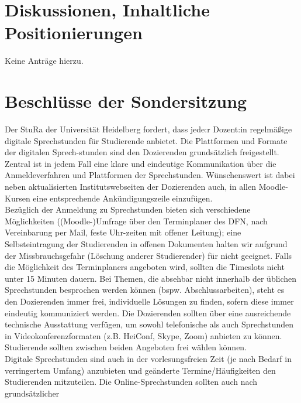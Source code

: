 \section{Diskussionen, Inhaltliche Positionierungen}
Keine Anträge hierzu.
\section{Beschlüsse der Sondersitzung}
    

    {
        Der StuRa der Universität Heidelberg fordert, dass jede:r Dozent:in regelmäßige
        digitale
        Sprechstunden für Studierende anbietet. Die Plattformen und Formate der digitalen
        Sprech-stunden sind den Dozierenden grundsätzlich freigestellt. Zentral ist in jedem
        Fall
        eine klare und eindeutige Kommunikation über die Anmeldeverfahren und Plattformen
        der Sprechstunden. Wünschenswert ist dabei neben aktualisierten Institutswebseiten
        der
        Dozierenden auch, in allen Moodle-Kursen eine entsprechende Ankündigungszeile
        einzufügen.\\
        Bezüglich der Anmeldung zu Sprechstunden bieten sich verschiedene Möglichkeiten
        ((Moodle-)Umfrage über den Terminplaner des DFN, nach Vereinbarung per Mail, feste
        Uhr-zeiten mit offener Leitung); eine Selbsteintragung der Studierenden in offenen
        Dokumenten halten wir aufgrund der Missbrauchsgefahr (Löschung anderer
        Studierender) für nicht geeignet. Falls die Möglichkeit des Terminplaners angeboten
        wird, sollten die Timeslots nicht unter 15 Minuten dauern. Bei Themen, die absehbar
        nicht innerhalb der üblichen Sprechstunden besprochen werden können (bspw.
        Abschlussarbeiten), steht es den Dozierenden immer frei, individuelle Lösungen zu
        finden, sofern diese immer eindeutig kommuniziert werden.
        Die Dozierenden sollten über eine ausreichende technische Ausstattung verfügen, um
        sowohl telefonische als auch Sprechstunden in Videokonferenzformaten (z.B. HeiConf,
        Skype, Zoom) anbieten zu können. Studierende sollten zwischen beiden Angeboten frei
        wählen können.\\
        Digitale Sprechstunden sind auch in der vorlesungsfreien Zeit (je nach Bedarf in
        verringertem Umfang) anzubieten und geänderte Termine/Häufigkeiten den
        Studierenden mitzuteilen. Die Online-Sprechstunden sollten auch nach grundsätzlicher
}
